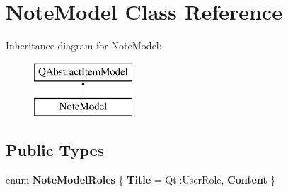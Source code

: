 \hypertarget{classNoteModel}{}\section{Note\+Model Class Reference}
\label{classNoteModel}
Inheritance diagram for Note\+Model\+:\begin{figure}[H]
\begin{center}
\leavevmode
\includegraphics[height=2.000000cm]{classNoteModel}
\end{center}
\end{figure}
\subsection*{Public Types}
\begin{DoxyCompactItemize}
\item 
\mbox{\label{classNoteModel_a77008f4402a891e33a05e4bd603d0fc3}} 
enum {\bfseries Note\+Model\+Roles} \{ {\bfseries Title} = Qt\+:\+:User\+Role, 
{\bfseries Content}
 \}
\end{DoxyCompactItemize}
